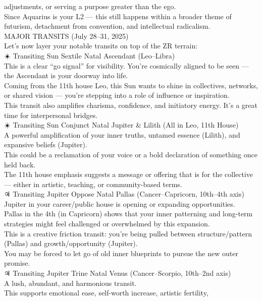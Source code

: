 \documentclass{article}
\begin{document}
adjustments, or serving a purpose greater than the ego.\\
Since Aquarius is your L2 --- this still happens within a broader theme
of futurism, detachment from convention, and intellectual radicalism.\\
 MAJOR TRANSITS (July 28--31, 2025)\\
Let's now layer your notable transits on top of the ZR terrain:\\
☀️ Transiting Sun Sextile Natal Ascendant (Leo--Libra)\\
This is a clear ``go signal'' for visibility. You're cosmically aligned
to be seen --- the Ascendant is your doorway into life.\\
Coming from the 11th house Leo, this Sun wants to shine in collectives,
networks, or shared vision --- you're stepping into a role of influence
or inspiration.\\
This transit also amplifies charisma, confidence, and initiatory energy.
It's a great time for interpersonal bridges.\\
☀️ Transiting Sun Conjunct Natal Jupiter \& Lilith (All in Leo, 11th
House)\\
A powerful amplification of your inner truths, untamed essence (Lilith),
and expansive beliefs (Jupiter).\\
This could be a reclamation of your voice or a bold declaration of
something once held back.\\
The 11th house emphasis suggests a message or offering that is for the
collective --- either in artistic, teaching, or community-based terms.\\
♃ Transiting Jupiter Oppose Natal Pallas (Cancer--Capricorn, 10th--4th
axis)\\
Jupiter in your career/public house is opening or expanding
opportunities.\\
Pallas in the 4th (in Capricorn) shows that your inner patterning and
long-term strategies might feel challenged or overwhelmed by this
expansion.\\
This is a creative friction transit: you're being pulled between
structure/pattern (Pallas) and growth/opportunity (Jupiter).\\
You may be forced to let go of old inner blueprints to pursue the new
outer promise.\\
♃ Transiting Jupiter Trine Natal Venus (Cancer--Scorpio, 10th--2nd
axis)\\
A lush, abundant, and harmonious transit.\\
This supports emotional ease, self-worth increase, artistic fertility,
\end{document}
